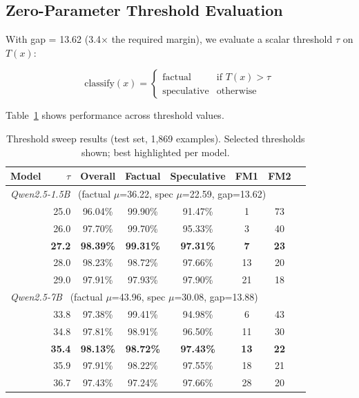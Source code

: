 \documentclass[11pt,a4paper]{article}
\begin{document}
\subsection{Zero-Parameter Threshold Evaluation}

With gap = 13.62 (3.4$\times$ the required margin), we evaluate a scalar threshold $\tau$ on $T(x)$:

\begin{equation}
\text{classify}(x) = \begin{cases}
\text{factual} & \text{if } T(x) > \tau \\
\text{speculative} & \text{otherwise}
\end{cases}
\end{equation}

Table~\ref{tab:threshold} shows performance across threshold values.

\begin{table}[h]
\centering
\caption{Threshold sweep results (test set, 1,869 examples). Selected thresholds shown; best highlighted per model.}
\label{tab:threshold}
\begin{tabular}{lrcccccc}
\toprule
Model & $\tau$ & Overall & Factual & Speculative & FM1 & FM2 \\
\midrule
\multicolumn{7}{l}{\textit{Qwen2.5-1.5B} \ (factual $\mu$=36.22, spec $\mu$=22.59, gap=13.62)} \\
& 25.0 & 96.04\% & 99.90\% & 91.47\% & 1 & 73 \\
& 26.0 & 97.70\% & 99.70\% & 95.33\% & 3 & 40 \\
& \textbf{27.2} & \textbf{98.39\%} & \textbf{99.31\%} & \textbf{97.31\%} & \textbf{7} & \textbf{23} \\
& 28.0 & 98.23\% & 98.72\% & 97.66\% & 13 & 20 \\
& 29.0 & 97.91\% & 97.93\% & 97.90\% & 21 & 18 \\
\midrule
\multicolumn{7}{l}{\textit{Qwen2.5-7B} \ (factual $\mu$=43.96, spec $\mu$=30.08, gap=13.88)} \\
& 33.8 & 97.38\% & 99.41\% & 94.98\% & 6 & 43 \\
& 34.8 & 97.81\% & 98.91\% & 96.50\% & 11 & 30 \\
& \textbf{35.4} & \textbf{98.13\%} & \textbf{98.72\%} & \textbf{97.43\%} & \textbf{13} & \textbf{22} \\
& 35.9 & 97.91\% & 98.22\% & 97.55\% & 18 & 21 \\
& 36.7 & 97.43\% & 97.24\% & 97.66\% & 28 & 20 \\
\bottomrule
\end{tabular}
\end{table}
\end{document}
